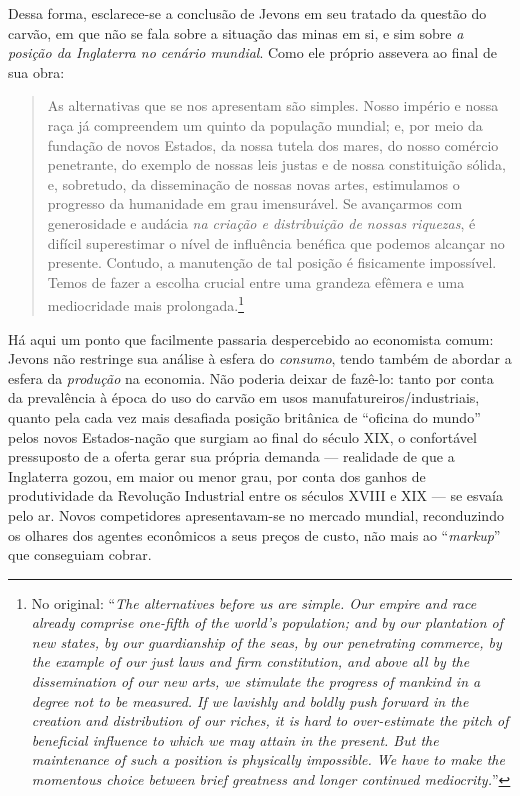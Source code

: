 Dessa forma, esclarece-se a conclusão de Jevons em seu tratado da questão do carvão, em que não se fala sobre a situação das minas em si, e sim sobre \textit{a posição da Inglaterra no cenário mundial}. Como ele próprio assevera ao final de sua obra: 
\begin{quote}
    As alternativas que se nos apresentam são simples. Nosso império e nossa raça já compreendem um quinto da população mundial; e, por meio da fundação de novos Estados, da nossa tutela dos mares, do nosso comércio penetrante, do exemplo de nossas leis justas e de nossa constituição sólida, e, sobretudo, da disseminação de nossas novas artes, estimulamos o progresso da humanidade em grau imensurável. Se avançarmos com generosidade e audácia \textit{na criação e distribuição de nossas riquezas}, é difícil superestimar o nível de influência benéfica que podemos alcançar no presente. Contudo, a manutenção de tal posição é fisicamente impossível. Temos de fazer a escolha crucial entre uma grandeza efêmera e uma mediocridade mais prolongada.\footnote{No original: ``\textit{The alternatives before us are simple. Our empire and race already comprise one-fifth of the world's population; and by our plantation of new states, by our guardianship of the seas, by our penetrating commerce, by the example of our just laws and firm constitution, and above all by the dissemination of our new arts, we stimulate the progress of mankind in a degree not to be measured. If we lavishly and boldly push forward in the creation and distribution of our riches, it is hard to over-estimate the pitch of beneficial influence to which we may attain in the present. But the maintenance of such a position is physically impossible. We have to make the momentous choice between brief greatness and longer continued mediocrity.}''} \parencite[p. 213, grifo meu]{Jevons1866}
\end{quote}

Há aqui um ponto que facilmente passaria despercebido ao economista comum: Jevons não restringe sua análise à esfera do \textit{consumo}, tendo também de abordar a esfera da \textit{produção} na economia. Não poderia deixar de fazê-lo: tanto por conta da prevalência à época do uso do carvão em usos manufatureiros/industriais, quanto pela cada vez mais desafiada posição britânica de ``oficina do mundo'' pelos novos Estados-nação que surgiam ao final do século XIX, o confortável pressuposto de a oferta gerar sua própria demanda --- realidade de que a Inglaterra gozou, em maior ou menor grau, por conta dos ganhos de produtividade da Revolução Industrial entre os séculos XVIII e XIX --- se esvaía pelo ar. Novos competidores apresentavam-se no mercado mundial, reconduzindo os olhares dos agentes econômicos a seus preços de custo, não mais ao ``\textit{markup}'' que conseguiam cobrar. 

